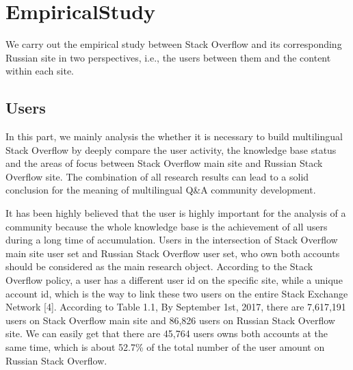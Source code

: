 
\chapter{EmpiricalStudy}

We carry out the empirical study between Stack Overflow and its corresponding Russian site in two perspectives, i.e., the users between them and the content within each site.

\section{Users}
In this part, we mainly analysis the whether it is necessary to build multilingual Stack Overflow by deeply compare the user activity, the knowledge base status and the areas of focus between Stack Overflow main site and Russian Stack Overflow site. The combination of all research results can lead to a solid conclusion for the meaning of multilingual Q\&A community development. \par 
It has been highly believed that the user is highly important for the analysis of a community because the whole knowledge base is the achievement of all users during a long time of accumulation. Users in the intersection of Stack Overflow main site user set and Russian Stack Overflow user set, who own both accounts should be considered as the main research object. According to the Stack Overflow policy, a user has a different user id on the specific site, while a unique account id, which is the way to link these two users on the entire Stack Exchange Network [4]. According to Table 1.1, By September 1st, 2017, there are 7,617,191 users on Stack Overflow main site and 86,826 users on Russian Stack Overflow site. We can easily get that there are 45,764 users owns both accounts at the same time, which is about 52.7\% of the total number of the user amount on Russian Stack Overflow.\par
